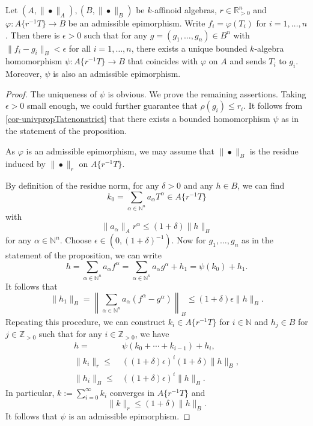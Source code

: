 \begin{proposition}\label{prop-admissepiperturbation}
    Let $(A,\|\bullet\|_A),(B,\|\bullet\|_B)$ be $k$-affinoid algebras, $r \in \mathbb{R}_{>0}^n$ and $\varphi:A\{r^{-1}T\}\rightarrow B$ be an admissible epimorphism. Write $f_i=\varphi(T_i)$ for $i=1,\ldots,n$. Then there is $\epsilon>0$ such that for any $g=(g_1,\ldots,g_n)\in B^n$ with $\|f_i-g_i\|_{B}<\epsilon$ for all $i=1,\ldots,n$, there exists a unique bounded $k$-algebra homomorphism $\psi: A\{r^{-1}T\}\rightarrow B$ that coincides with $\varphi$ on $A$ and sends $T_i$ to $g_i$. Moreover, $\psi$ is also an admissible epimorphism.
\end{proposition}
\begin{proof}
    The uniqueness of $\psi$ is obvious. We prove the remaining assertions.
    Taking $\epsilon>0$ small enough, we could further guarantee that $\rho(g_i)\leq r_i$. It follows from \cref{cor-univpropTatenonstrict} that there exists a bounded homomorphism $\psi$ as in the statement of the proposition.

    As $\varphi$ is an admissible epimorphism, we may assume that $\|\bullet\|_B$ is the residue induced by $\|\bullet\|_{r}$ on $A\{r^{-1}T\}$.

    By definition of the residue norm, for any $\delta>0$ and any $h\in B$, we can find 
    \[
        k_0=\sum_{\alpha\in \mathbb{N}^n}a_{\alpha} T^{\alpha}\in A\{r^{-1}T\}  
    \]
    with
    \[
        \|a_{\alpha}\|_A r^{\alpha}\leq (1+\delta)\|h\|_B 
    \]
    for any $\alpha \in \mathbb{N}^n$. Choose $\epsilon\in (0, (1+\delta)^{-1})$. Now for $g_1,\ldots,g_n$ as in the statement of the proposition, we can write
    \[
        h=\sum_{\alpha\in \mathbb{N}^n}  a_{\alpha}f^{\alpha}=\sum_{\alpha\in \mathbb{N}^n}  a_{\alpha}g^{\alpha}+h_1=\psi(k_0)+h_1.
    \]
    It follows that
    \[
      \|h_1\|_B=\left\| \sum_{\alpha\in \mathbb{N}^n}  a_{\alpha}(f^{\alpha}-g^{\alpha})\right\|_B\leq (1+\delta)\epsilon \|h\|_B.
    \]
    Repeating this procedure, we can construct $k_i\in A\{r^{-1}T\}$ for $i\in \mathbb{N}$ and $h_j\in B$ for $j\in \mathbb{Z}_{>0}$ such that for any $i\in \mathbb{Z}_{>0}$, we have
    \[
        \begin{aligned}
        h=&\psi(k_0+\cdots+k_{i-1})+h_i,\\
        \|k_i\|_r\leq & ((1+\delta)\epsilon)^i(1+\delta)\|h\|_B,\\
         \|h_i\|_B\leq & ((1+\delta)\epsilon)^i\|h\|_B.
        \end{aligned}
    \]
    In particular, $k:=\sum_{i=0}^{\infty} k_i$ converges in $A\{r^{-1}T\}$ and
    \[
        \|k\|_r\leq (1+\delta)\|h\|_B.
    \]  
    It follows that $\psi$ is an admissible epimorphism.
\end{proof}

